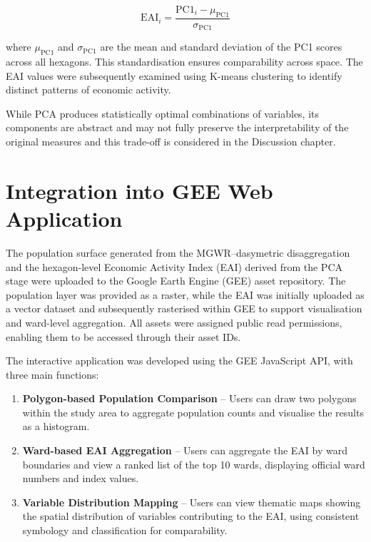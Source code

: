 \documentclass[
  12pt,
  oneside]{book}
\providecommand{\tightlist}{%
  \setlength{\itemsep}{0pt}\setlength{\parskip}{0pt}}
\begin{document}
\begin{equation} 
  \text{EAI}_i = \frac{\text{PC1}_i - \mu_{\text{PC1}}}{\sigma_{\text{PC1}}}
  \label{eq:EAI}
\end{equation}

where \(\mu_{\text{PC1}}\) and \(\sigma_{\text{PC1}}\) are the mean and standard deviation of the PC1 scores across all hexagons. This standardisation ensures comparability across space. The EAI values were subsequently examined using K-means clustering to identify distinct patterns of economic activity.

While PCA produces statistically optimal combinations of variables, its components are abstract and may not fully preserve the interpretability of the original measures and this trade-off is considered in the Discussion chapter.

\section{Integration into GEE Web Application}\label{integration-into-gee-web-application}

The population surface generated from the MGWR--dasymetric disaggregation and the hexagon-level Economic Activity Index (EAI) derived from the PCA stage were uploaded to the Google Earth Engine (GEE) asset repository. The population layer was provided as a raster, while the EAI was initially uploaded as a vector dataset and subsequently rasterised within GEE to support visualisation and ward-level aggregation. All assets were assigned public read permissions, enabling them to be accessed through their asset IDs.

The interactive application was developed using the GEE JavaScript API, with three main functions:

\begin{enumerate}
\def\labelenumi{\arabic{enumi}.}
\tightlist
\item
  \textbf{Polygon-based Population Comparison} -- Users can draw two polygons within the study area to aggregate population counts and visualise the results as a histogram.
\item
  \textbf{Ward-based EAI Aggregation} -- Users can aggregate the EAI by ward boundaries and view a ranked list of the top 10 wards, displaying official ward numbers and index values.
\item
  \textbf{Variable Distribution Mapping} -- Users can view thematic maps showing the spatial distribution of variables contributing to the EAI, using consistent symbology and classification for comparability.
\end{enumerate}
\end{document}
